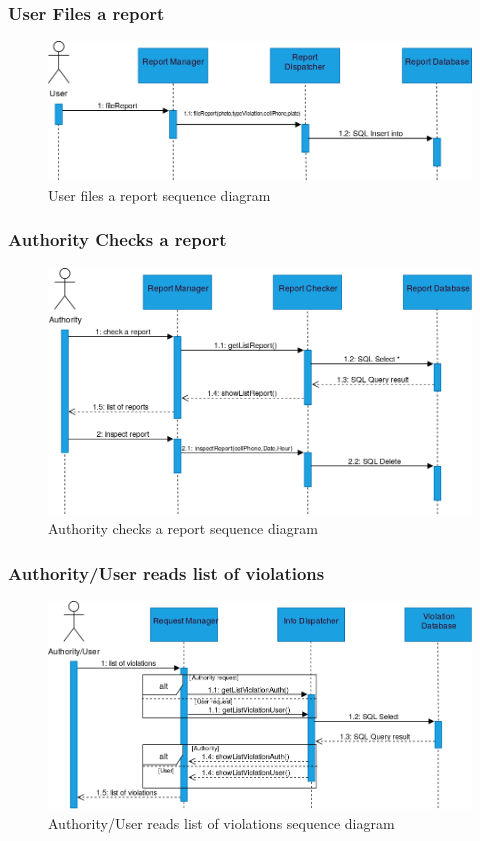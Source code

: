 \subsubsection{User Files a report}
	\begin{figure}[H]
		\includegraphics[width=\textwidth]{Images/RunTimeViewUserReport.png}		
		\caption{\label{fig:UserReport}User files a report sequence diagram}
	\end{figure}
\subsubsection{Authority Checks a report}
	\begin{figure}[H]
		\includegraphics[width=\textwidth]{Images/RunTimeViewAuthorityCheck.png}		
		\caption{\label{fig:UserReport}Authority checks a report sequence diagram}
	\end{figure}
\subsubsection{Authority/User reads list of violations}
	\begin{figure}[H]
		\includegraphics[width=\textwidth]{Images/RunTimeViewListViolation.png}		
		\caption{\label{fig:UserReport}Authority/User reads list of violations sequence diagram}
	\end{figure}

